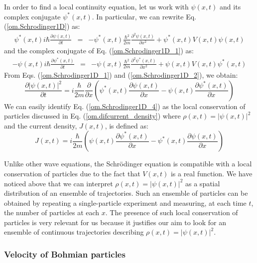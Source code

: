 \documentclass[onecolumn,nofootinbib, secnumarabic, amsmath, nobibnotes,11pt,aps,pra]{revtex4-1}
\newcommand{\eref}[1]{Eq. (\ref{#1})}
\begin{document}
In order to find a local continuity equation, let us work with $\psi(x,t)$ and its complex conjugate $\psi^*(x,t)$. In particular, we can rewrite \eref{om.Schrodinger1D} as:
\begin{eqnarray}
\psi^*(x,t) i \hbar \frac{\partial \psi(x,t)} {\partial t} &=& -\psi^*(x,t)\frac {\hbar^2} {2m} \frac{ {\partial}^2 \psi(x,t)} {\partial x^2}+ \psi^*(x,t) V(x,t) \psi(x,t)
\label{om.Schrodinger1D_1}
\end{eqnarray}
and the complex conjugate of \eref{om.Schrodinger1D_1} as:
\begin{eqnarray}
-\psi(x,t)i \hbar \frac{\partial \psi^*(x,t)} {\partial t} &=& -\psi(x,t)\frac {\hbar^2} {2m} \frac{ {\partial}^2 \psi^*(x,t)} {\partial x^2}+ \psi(x,t)V(x,t) \psi^*(x,t)
\label{om.Schrodinger1D_2}
\end{eqnarray}
From Eqs. (\ref{om.Schrodinger1D_1}) and (\ref{om.Schrodinger1D_2}), we obtain:
\begin{equation}
\label{om.Schrodinger1D_4}
 \frac{\partial |\psi(x,t)|^2} {\partial t} = i\frac {\hbar} {2m} \frac {\partial} {\partial x} \left(\psi^*(x,t) \frac{ {\partial} \psi(x,t)} {\partial x} - \psi(x,t) \frac{ {\partial} \psi^*(x,t)} {\partial x} \right)
\end{equation}
We can easily identify \eref{om.Schrodinger1D_4} as the local conservation of particles discussed in \eref{om.difcurrent_density} where $\rho(x,t) = |\psi(x,t)|^2$ and the current density, $J(x,t)$, is defined as:
\begin{equation}
\label{om.current}
J(x,t) = i \frac {\hbar} {2 m} \left(\psi(x,t) \frac {\partial \psi^{*}(x,t)} {\partial x}- \psi^{*}(x,t) \frac {\partial \psi(x,t)} {\partial x} \right)
\end{equation}

Unlike other  wave equations, the Schr\"odinger equation is compatible
with a local conservation of particles due to the fact that $V(x,t)$
is a real function. We have noticed above that we can interpret
$\rho(x,t) = |\psi(x,t)|^2$ as a spatial distribution of an ensemble
of trajectories. Such an ensemble of particles can be obtained by
repeating a single-particle experiment and measuring, at each time
$t$, the number of particles  at each $x$. The presence of such local
conservation of particles is very relevant for us because it
justifies our aim to look for an ensemble of continuous trajectories
describing $\rho(x,t) = |\psi(x,t)|^2$.

\subsubsection{Velocity of Bohmian particles}
\end{document}
